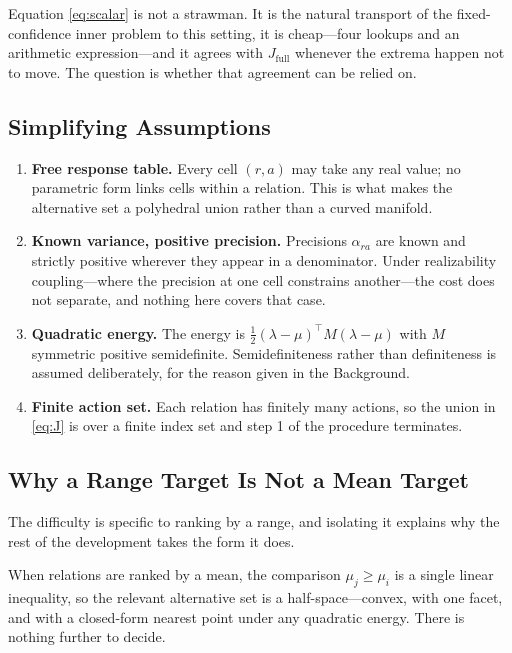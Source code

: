 \documentclass[conference]{IEEEtran}
\theoremstyle{definition}
\begin{document}
Equation \eqref{eq:scalar} is not a strawman. It is the natural transport of the
fixed-confidence inner problem to this setting, it is cheap---four lookups and an arithmetic
expression---and it agrees with $J_{\mathrm{full}}$ whenever the extrema happen not to move.
The question is whether that agreement can be relied on.

\subsection{Simplifying Assumptions}

\begin{enumerate}
\item[1)] \textbf{Free response table.} Every cell $(r,a)$ may take any real value; no
parametric form links cells within a relation. This is what makes the alternative set a
polyhedral union rather than a curved manifold.

\item[2)] \textbf{Known variance, positive precision.} Precisions $\alpha_{ra}$ are known and
strictly positive wherever they appear in a denominator. Under realizability coupling---where
the precision at one cell constrains another---the cost does not separate, and nothing here
covers that case.

\item[3)] \textbf{Quadratic energy.} The energy is $\tfrac12(\lambda-\mu)^{\top}M(\lambda-\mu)$
with $M$ symmetric positive semidefinite. Semidefiniteness rather than definiteness is
assumed deliberately, for the reason given in the Background.

\item[4)] \textbf{Finite action set.} Each relation has finitely many actions, so the union in
\eqref{eq:J} is over a finite index set and step 1 of the procedure terminates.
\end{enumerate}

\subsection{Why a Range Target Is Not a Mean Target}

The difficulty is specific to ranking by a range, and isolating it explains why the rest of
the development takes the form it does.

When relations are ranked by a mean, the comparison $\mu_{j}\ge\mu_{i}$ is a single linear
inequality, so the relevant alternative set is a half-space---convex, with one facet, and
with a closed-form nearest point under any quadratic energy. There is nothing further to
decide.
\end{document}
